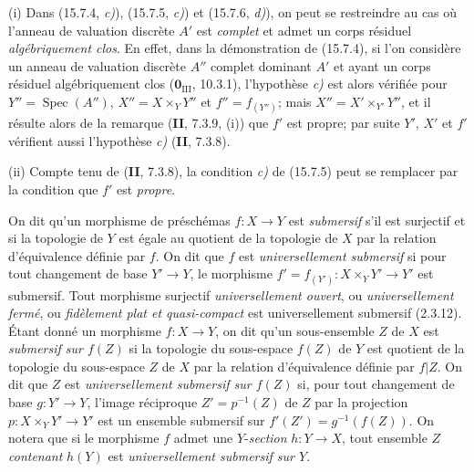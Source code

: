 \begin{remarks}[15.7.7]
\label{IV.15.7.7-fr}
(i) Dans (15.7.4, \emph{c)}), (15.7.5, \emph{c)}) et (15.7.6, \emph{d)}), on peut se restreindre au cas où l'anneau de valuation discrète $A'$ est \emph{complet} et admet un corps résiduel \emph{algébriquement clos}. En effet, dans la démonstration de (15.7.4), si l'on considère un anneau de valuation discrète $A''$ complet dominant $A'$ et ayant un corps résiduel algébriquement clos ($\mathbf{0}_{\mathrm{III}}$, 10.3.1), l'hypothèse \emph{c)} est alors vérifiée pour $Y''=\operatorname{Spec}(A'')$, $X''=X\times_Y Y''$ et $f''=f_{(Y'')}$; mais $X''=X'\times_{Y'}Y''$, et il résulte alors de la remarque (\textbf{II}, 7.3.9, (i)) que $f'$ est propre; par suite $Y'$, $X'$ et $f'$ vérifient aussi l'hypothèse \emph{c)} (\textbf{II}, 7.3.8).

(ii) Compte tenu de (\textbf{II}, 7.3.8), la condition \emph{c)} de (15.7.5) peut se remplacer par la condition que $f'$ est \emph{propre}.
\end{remarks}

\begin{env}[15.7.8]
\label{IV.15.7.8-fr}
On dit qu'un morphisme de préschémas $f:X\to Y$ est \emph{submersif} s'il est surjectif et si la topologie de $Y$ est égale au quotient de la topologie de $X$ par la relation d'équivalence définie par $f$. On dit que $f$ est \emph{universellement submersif} si pour tout changement de base $Y'\to Y$, le morphisme $f'=f_{(Y')}:X\times_Y Y'\to Y'$ est submersif. Tout morphisme surjectif \emph{universellement ouvert}, ou \emph{universellement fermé}, ou \emph{fidèlement plat et quasi-compact} est universellement submersif (2.3.12). Étant donné un morphisme $f:X\to Y$, on dit qu'un sous-ensemble $Z$ de $X$ est \emph{submersif sur $f(Z)$} si la topologie du sous-espace $f(Z)$ de $Y$ est quotient de la topologie du sous-espace $Z$ de $X$ par la relation d'équivalence définie par $f|Z$. On dit que $Z$ est \emph{universellement submersif sur $f(Z)$} si, pour tout changement de base $g:Y'\to Y$, l'image réciproque $Z'=p^{-1}(Z)$ de $Z$ par la projection $p:X\times_Y Y'\to Y'$ est un ensemble submersif sur $f'(Z')=g^{-1}(f(Z))$. On notera que si le morphisme $f$ admet une $Y$-\emph{section} $h:Y\to X$, tout ensemble $Z$ \emph{contenant} $h(Y)$ est \emph{universellement submersif sur $Y$}.
\end{env}

